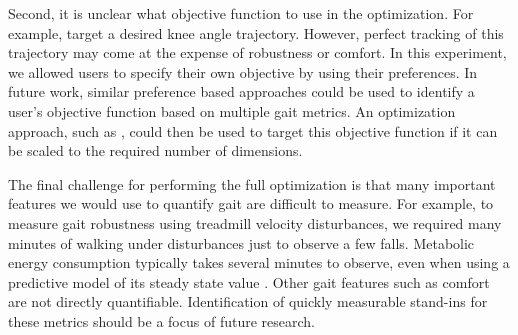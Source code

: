 Second, it is unclear what objective function to use in the optimization. For
example, \citet{wen2019online} target a desired knee angle trajectory. However,
perfect tracking of this trajectory may come at the expense of robustness or
comfort. In this experiment, we allowed users to specify their own objective by
using their preferences. In future work, similar preference based approaches could
be used to identify a user's objective function based on multiple gait metrics.
An optimization approach, such as \citet{wen2019online}, could then be used to
target this objective function if it can be scaled to the required number of
dimensions.

The final challenge for performing the full optimization is that many important
features we would use to quantify gait are difficult to measure. For example, to
measure gait robustness using treadmill velocity disturbances, we required many
minutes of walking under disturbances just to observe a few falls. Metabolic
energy consumption typically takes several minutes to observe, even when using a
predictive model of its steady state value \citep{zhang2017human}. Other gait
features such as comfort are not directly quantifiable. Identification of
quickly measurable stand-ins for these metrics should be a focus of future
research.

